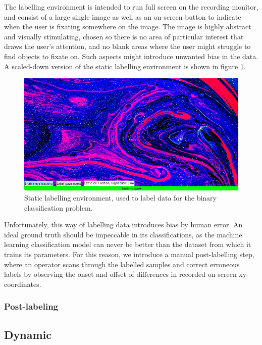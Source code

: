 The labelling environment is intended to run full screen on the recording monitor, and consist of a large single image as well as an on-screen button to indicate when the user is fixating somewhere on the image. The image is highly abstract and visually stimulating, chosen so there is no area of particular interest that draws the user's attention, and no blank areas where the user might struggle to find objects to fixate on. Such aspects might introduce unwanted bias in the data. A scaled-down version of the static labelling environment is shown in figure \ref{fig:meth_StaticLabellingEnv}.

\begin{figure}[h]
    \centering
    \includegraphics[width=\textwidth]{Images/Labelling/StaticEnvironment2.png}
    \caption{Static labelling environment, used to label data for the binary classification problem.}
    \label{fig:meth_StaticLabellingEnv}
\end{figure}

Unfortunately, this way of labelling data introduces bias by human error. An ideal ground truth should be impeccable in its classifications, as the machine learning classification model can never be better than the dataset from which it trains its parameters. For this reason, we introduce a manual post-labelling step, where an operator scans through the labelled samples and correct erroneous labels by observing the onset and offset of differences in recorded on-screen xy-coordinates.

\subsubsection{Post-labeling}

\subsection{Dynamic}

